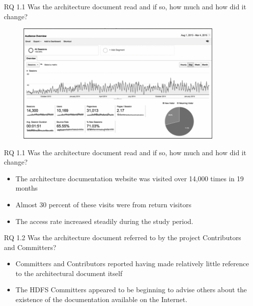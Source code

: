 \documentclass[t,14pt,mathserif]{beamer}
\begin{document}
\begin{frame}{RQ 1.1 Was the architecture document read and if so, how much and how did it change?}
	
	\begin{figure}[!t]
		\centering
		\includegraphics[width=4.0in]{../img/visitors}
		\label{fig:visitors}
	\end{figure}
		
\end{frame}


\begin{frame}{RQ 1.1 Was the architecture document read and if so, how much and how did it change?}
	
	\begin{itemize}
		\item The architecture documentation website was visited over 14,000 times in 19 months
		\item Almost 30 percent of these visits were from return visitors
		\item The access rate increased steadily during the study period.
	\end{itemize}

	
\end{frame}


\begin{frame}{RQ 1.2 Was the architecture document referred to by the project Contributors and Committers?}
	
	\begin{itemize}
		\item Committers and Contributors reported having made relatively little reference to the architectural document itself
		\item The HDFS Committers appeared to be beginning to advise others about the existence of the documentation available on the Internet.
	\end{itemize}

\end{frame}
\end{document}
